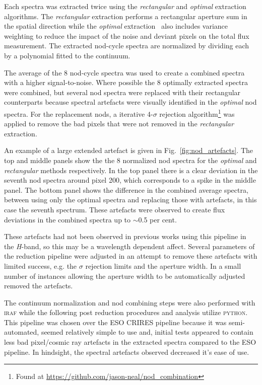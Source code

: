 \documentclass[fleqn,usenatbib]{mnras}
\begin{document}
Each spectra was extracted twice using the \emph{rectangular} and \emph{optimal} extraction algorithms.
The \emph{rectangular} extraction performs a rectangular aperture sum in the spatial direction while the \emph{optimal} extraction~\citep{horne_optimal_1986} also includes variance weighting to reduce the impact of the noise and deviant pixels on the total flux measurement. {The extracted nod-cycle spectra are normalized by dividing each by a polynomial fitted to the continuum.}

The average of the 8 nod-cycle spectra was used to create a combined spectra with a higher signal-to-noise.
Where possible the 8 optimally extracted spectra were combined, but several nod spectra were replaced with their rectangular counterparts because spectral artefacts were visually identified in the \emph{optimal} nod spectra. For the replacement nods, a iterative 4-\(\sigma\) rejection algorithm\footnote{Found at \url{https://github.com/jason-neal/nod_combination}} was applied to remove the bad pixels that were not removed in the \emph{rectangular} extraction.

An example of a large extended artefact is given in Fig.~\ref{fig:nod_artefacts}. The top and middle panels show the the 8 normalized nod spectra for the \emph{optimal} and \emph{rectangular} methods respectively. In the top panel there is a clear deviation in the seventh nod spectra around pixel 200, which corresponds to a spike in the middle panel. The bottom panel shows the difference in the combined average spectra, between using only the optimal spectra and replacing those with artefacts, in this case the seventh spectrum. These artefacts were observed to create flux deviations in the combined spectra up to \(\sim\)0.5 per cent.

These artefacts had not been observed in previous works using this pipeline in the \textit{H}-band, so this may be a wavelength dependent affect.
Several parameters of the reduction pipeline were adjusted in an attempt to  remove these artefacts with limited success, e.g. the $\sigma$ rejection limits and the aperture width. In a small number of instances allowing the aperture width to be automatically adjusted removed the artefacts.

The continuum normalization and nod combining steps were also performed with \textsc{iraf} while the following post reduction procedures and analysis utilize \textsc{python}. This pipeline was chosen over the ESO CRIRES pipeline because it was semi-automated, seemed relatively simple to use and, initial tests appeared to contain less bad pixel/cosmic ray artefacts in the extracted spectra compared to the ESO pipeline. In hindsight, the spectral artefacts observed decreased it's ease of use.
\end{document}
